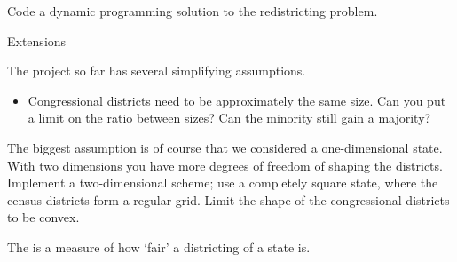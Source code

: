 \begin{comment}
\begin{itemize}
\item If you know the results for districting ten voters:
  \begin{itemize}
  \item you know the overall district majority, and
  \item you know the majority in the last district
  \end{itemize}
\item then for eleven voters you can
  \begin{itemize}
  \item add the new voter to the previous district, and compute the
    new majorities, overall and in the last district, or
  \item turn the new voter into a new district, and compute the two majorities.
  \end{itemize}
\item You need to compute the implications of adding the new voter,
  once for each possible districting of ten voters. 
\end{itemize}
\end{comment}

\begin{exercise}
  Code a dynamic programming solution to the redistricting problem. 
\end{exercise}

 {Extensions}

The project so far has several simplifying assumptions.
\begin{itemize}
\item Congressional districts need to be approximately the same
  size. Can you put a limit on the ratio between sizes? Can the
  minority still gain a majority?
\end{itemize}

\begin{exercise}
  The biggest assumption is of course that we considered a
  one-dimensional state. With two dimensions you have more degrees of
  freedom of shaping the districts. Implement a two-dimensional
  scheme; use a completely square state, where the census districts
  form a regular grid. Limit the shape of the congressional districts
  to be convex.
\end{exercise}

The  is a measure of how `fair' a
districting of a state is. 

